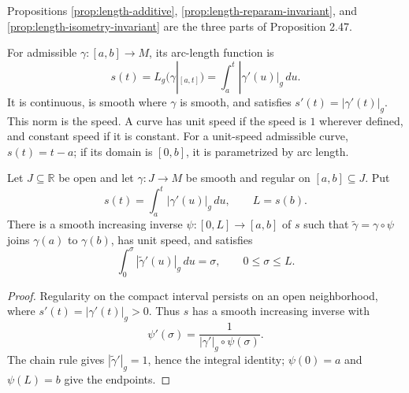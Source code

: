 Propositions \ref{prop:length-additive}, \ref{prop:length-reparam-invariant}, and \ref{prop:length-isometry-invariant} are the three parts of Proposition 2.47.

For admissible $\gamma:[a,b]\to M$, its arc-length function is
\[
s(t)=L_g(\gamma|_{[a,t]})=\int_a^t|\gamma'(u)|_g\,du.
\]
It is continuous, is smooth where $\gamma$ is smooth, and satisfies $s'(t)=|\gamma'(t)|_g$. This norm is the speed. A curve has unit speed if the speed is $1$ wherever defined, and constant speed if it is constant. For a unit-speed admissible curve, $s(t)=t-a$; if its domain is $[0,b]$, it is parametrized by arc length.

\begin{proposition}
\label{prop:regular-curve-unit-speed-reparam}
\leanok
{}
Let $J\subseteq\mathbb R$ be open and let $\gamma:J\to M$ be smooth and regular on $[a,b]\subseteq J$. Put
\[
s(t)=\int_a^t|\gamma'(u)|_g\,du,\qquad L=s(b).
\]
There is a smooth increasing inverse $\psi:[0,L]\to[a,b]$ of $s$ such that $\widetilde\gamma=\gamma\circ\psi$ joins $\gamma(a)$ to $\gamma(b)$, has unit speed, and satisfies
\[
\int_0^\sigma|\widetilde\gamma'(u)|_g\,du=\sigma,\qquad 0\le\sigma\le L.
\]
\end{proposition}
\begin{proof}
\leanok
{}
\sketch Regularity on the compact interval persists on an open neighborhood, where $s'(t)=|\gamma'(t)|_g>0$. Thus $s$ has a smooth increasing inverse with
\[
\psi'(\sigma)=\frac1{|\gamma'|_g\circ\psi(\sigma)}.
\]
The chain rule gives $|\widetilde\gamma'|_g=1$, hence the integral identity; $\psi(0)=a$ and $\psi(L)=b$ give the endpoints.
\end{proof}

